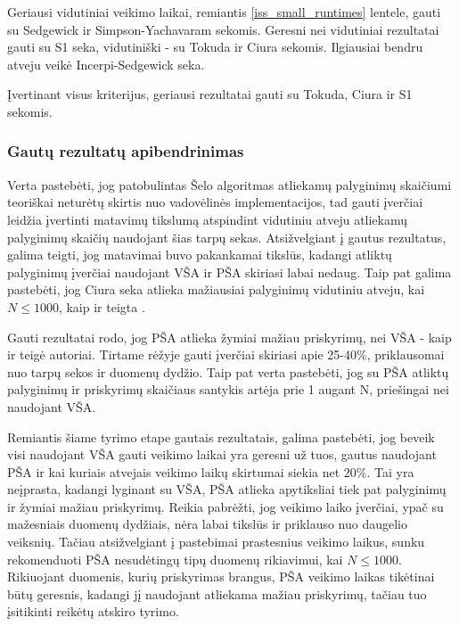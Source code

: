 \documentclass{VUMIFInfKursinis}
\begin{document}
Geriausi vidutiniai veikimo laikai, remiantis \ref{iss_small_runtimes} lentele, gauti su Sedgewick ir Simpson-Yachavaram sekomis.
Geresni nei vidutiniai rezultatai gauti su S1 seka,
vidutiniški - su Tokuda ir Ciura sekomis.
Ilgiausiai bendru atveju veikė Incerpi-Sedgewick seka.

Įvertinant visus kriterijus, geriausi rezultatai gauti su Tokuda, Ciura ir S1 sekomis.


\subsubsection{Gautų rezultatų apibendrinimas}

Verta pastebėti, jog patobulintas Šelo algoritmas atliekamų palyginimų skaičiumi teoriškai neturėtų skirtis nuo vadovėlinės implementacijos,
tad gauti įverčiai leidžia įvertinti matavimų tikslumą atspindint vidutiniu atveju atliekamų palyginimų skaičių naudojant šias tarpų sekas.
Atsižvelgiant į gautus rezultatus, galima teigti, jog matavimai buvo pakankamai tikslūs, kadangi atliktų palyginimų įverčiai naudojant VŠA ir PŠA skiriasi labai nedaug.
Taip pat galima pastebėti, jog Ciura seka atlieka mažiausiai palyginimų vidutiniu atveju, kai $N \leq 1000$, kaip ir teigta \cite{ciura2001best}.

Gauti rezultatai rodo, jog PŠA atlieka žymiai mažiau priskyrimų, nei VŠA - kaip ir teigė \cite{Radavičius_Baranauskas_2013} autoriai.
Tirtame rėžyje gauti įverčiai skiriasi apie 25-40\%, priklausomai nuo tarpų sekos ir duomenų dydžio.
Taip pat verta pastebėti, jog su PŠA atliktų palyginimų ir priskyrimų skaičiaus santykis artėja prie 1 augant N, priešingai nei naudojant VŠA.

Remiantis šiame tyrimo etape gautais rezultatais, galima pastebėti, jog beveik visi naudojant VŠA gauti veikimo laikai yra geresni už tuos, gautus naudojant PŠA
ir kai kuriais atvejais veikimo laikų skirtumai siekia net 20\%.
Tai yra neįprasta, kadangi lyginant su VŠA, PŠA atlieka apytiksliai tiek pat palyginimų ir žymiai mažiau priskyrimų.
Reikia pabrėžti, jog veikimo laiko įverčiai, ypač su mažesniais duomenų dydžiais, nėra labai tikslūs ir priklauso nuo daugelio veiksnių.
Tačiau atsižvelgiant į pastebimai prastesnius veikimo laikus, sunku rekomenduoti PŠA nesudėtingų tipų duomenų rikiavimui, kai $N \leq 1000$.
Rikiuojant duomenis, kurių priskyrimas brangus, PŠA veikimo laikas tikėtinai būtų geresnis, kadangi jį naudojant atliekama mažiau priskyrimų, tačiau tuo įsitikinti reikėtų atskiro tyrimo.  
 
\end{document}
